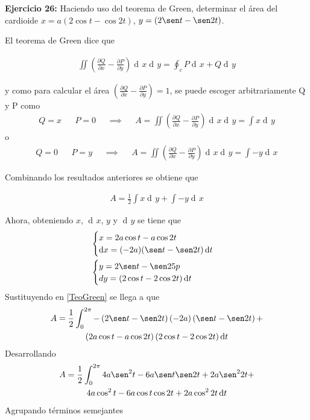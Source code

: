 \documentclass[12pt]{article}
\DeclareMathOperator{\di}{d\!}
\begin{document}
\vspace{5mm}

\noindent \textbf{Ejercicio 26:} Haciendo uso del teorema de Green, determinar el área del 
cardioide $x = a(2\cos t - \cos 2t)$, $y = (2\sen t - \sen 2t)$.
\vspace{5mm}

\vspace{3mm}
El teorema de Green dice que 

\begin{align*}
	\iint \left( \frac{\partial Q}{\partial x} 
	- \frac{\partial P}{\partial y} \right) \di x \di y =
	\oint_c P \di x + Q \di y  
\end{align*}

y como para calcular el área $\left( \frac{\partial Q}{\partial x} 
- \frac{\partial P}{\partial y} \right) = 1$, se puede escoger
arbitrariamente Q y P como
\begin{align*}
	Q = x && P = 0 &&\implies  &&A = \iint \left( \frac{\partial Q}{\partial x} 
	- \frac{\partial P}{\partial y} \right) \di x \di y = \int x \di y
\end{align*}
o
\begin{align*}
	Q = 0 && P = y &&\implies  &&A = \iint \left( \frac{\partial Q}{\partial x} 
	- \frac{\partial P}{\partial y} \right) \di x \di y = \int -y \di x
\end{align*}

Combinando los resultados anteriores se obtiene que 

\begin{align} \label{TeoGreen}
	A = \frac{1}{2}  \int x \di y + \int -y \di x
\end{align}

Ahora, obteniendo $x$, $\di x$, $y$ y $\di y$ se tiene que 
\begin{align*}
	&\begin{cases}
		x = 2a \cos t - a \cos 2t \\
		\di x = (-2a)(\sen t - \sen 2t) \di t
	\end{cases} \\
	&\begin{cases}
		y = 2 \sen t - \sen 25p \\
		dy = (2\cos t - 2\cos 2t)\di t
	\end{cases}
\end{align*}
Sustituyendo en \ref{TeoGreen} se llega a que 
\begin{multline*}
	A = \frac{1}{2} \int_0^{2\pi} -\left(2 \sen t - \sen 2t \right)\left(-2a
	\right)\left(\sen t - \sen 2t\right)
	+\\ \left(2a \cos t - a\cos 2t \right)\left(2 \cos t - 2 \cos 2t\right) \di t	
\end{multline*}
Desarrollando
\begin{multline*}
	A = \frac{1}{2} \int_0^{2\pi} 4a \sen^2 t - 6a \sen t \sen 2t + 2a \sen^2 2t +\\
	4a \cos^2 t - 6a \cos t \cos 2t + 2a \cos^2 2t \di t
\end{multline*}
Agrupando términos semejantes
\end{document}
